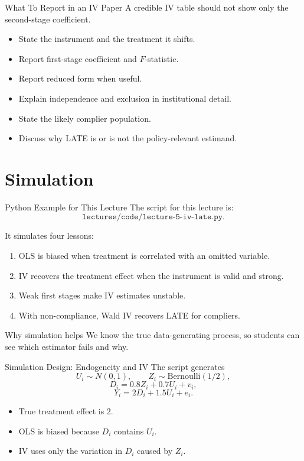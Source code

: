 \documentclass[11pt,aspectratio=169]{beamer}
\begin{document}
\begin{frame}{What To Report in an IV Paper}
  A credible IV table should not show only the second-stage coefficient.

  \begin{itemize}
    \item State the instrument and the treatment it shifts.
    \item Report first-stage coefficient and \(F\)-statistic.
    \item Report reduced form when useful.
    \item Explain independence and exclusion in institutional detail.
    \item State the likely complier population.
    \item Discuss why LATE is or is not the policy-relevant estimand.
  \end{itemize}
\end{frame}

\section{Simulation}

\begin{frame}{Python Example for This Lecture}
  The script for this lecture is:
  \[
    \texttt{lectures/code/lecture-5-iv-late.py}.
  \]

  It simulates four lessons:
  \begin{enumerate}
    \item OLS is biased when treatment is correlated with an omitted variable.
    \item IV recovers the treatment effect when the instrument is valid and strong.
    \item Weak first stages make IV estimates unstable.
    \item With non-compliance, Wald IV recovers LATE for compliers.
  \end{enumerate}

  \begin{block}{Why simulation helps}
    We know the true data-generating process, so students can see which estimator fails and why.
  \end{block}
\end{frame}

\begin{frame}{Simulation Design: Endogeneity and IV}
  The script generates
  \[
    U_i \sim N(0,1),
    \qquad
    Z_i \sim \text{Bernoulli}(1/2),
  \]
  \[
    D_i = 0.8Z_i + 0.7U_i + v_i,
  \]
  \[
    Y_i = 2D_i + 1.5U_i + e_i.
  \]

  \begin{itemize}
    \item True treatment effect is 2.
    \item OLS is biased because \(D_i\) contains \(U_i\).
    \item IV uses only the variation in \(D_i\) caused by \(Z_i\).
  \end{itemize}
\end{frame}
\end{document}

